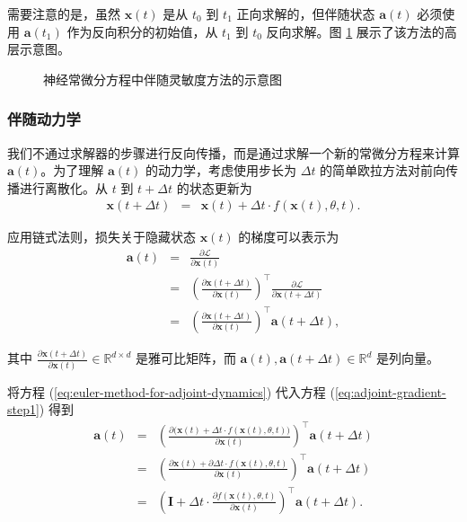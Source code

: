需要注意的是，虽然 $\mathbf{x}(t)$ 是从 $t_0$ 到 $t_1$ 正向求解的，但伴随状态 $\mathbf{a}(t)$ 必须使用 $\mathbf{a}(t_1)$ 作为反向积分的初始值，从 $t_1$ 到 $t_0$ 反向求解。图 \ref{fig:adjoint-sensitivity-method} 展示了该方法的高层示意图。

\begin{figure}[!t]
\centering
{}
\caption{神经常微分方程中伴随灵敏度方法的示意图
}
\label{fig:adjoint-sensitivity-method}
\end{figure}
\subsubsection{伴随动力学}

我们不通过求解器的步骤进行反向传播，而是通过求解一个新的常微分方程来计算 $\mathbf{a}(t)$。为了理解 $\mathbf{a}(t)$ 的动力学，考虑使用步长为 $\Delta t$ 的简单欧拉方法对前向传播进行离散化。从 $t$ 到 $t+\Delta t$ 的状态更新为
\begin{eqnarray}
\mathbf{x}(t+\Delta t) & = & \mathbf{x}(t) + \Delta t \cdot f(\mathbf{x}(t), \theta, t). \label{eq:euler-method-for-adjoint-dynamics}
\end{eqnarray}

应用链式法则，损失关于隐藏状态 $\mathbf{x}(t)$ 的梯度可以表示为
\begin{eqnarray}
\mathbf{a}(t) & = & \frac{\partial \mathcal{L}}{\partial \mathbf{x}(t)} \nonumber \\
& = & \left( \frac{\partial \mathbf{x}(t+\Delta t)}{\partial \mathbf{x}(t)} \right)^\top \frac{\partial \mathcal{L}}{\partial \mathbf{x}(t+\Delta t)} \nonumber \\
& = & \left( \frac{\partial \mathbf{x}(t+\Delta t)}{\partial \mathbf{x}(t)} \right)^\top \mathbf{a}(t+\Delta t), \label{eq:adjoint-gradient-step1}
\end{eqnarray}

\noindent 其中 $\frac{\partial \mathbf{x}(t+\Delta t)}{\partial \mathbf{x}(t)} \in \mathbb{R}^{d \times d}$ 是雅可比矩阵，而 $\mathbf{a}(t), \mathbf{a}(t+\Delta t) \in \mathbb{R}^{d}$ 是列向量。

将方程 (\ref{eq:euler-method-for-adjoint-dynamics}) 代入方程 (\ref{eq:adjoint-gradient-step1}) 得到
\begin{eqnarray}
\mathbf{a}(t) & = & \left( \frac{\partial \big( \mathbf{x}(t) + \Delta t \cdot f(\mathbf{x}(t), \theta, t) \big)}{\partial \mathbf{x}(t)} \right)^\top \mathbf{a}(t+\Delta t) \nonumber \\
& = & \left( \frac{\partial \mathbf{x}(t) + \partial \Delta t \cdot f(\mathbf{x}(t), \theta, t) }{\partial \mathbf{x}(t)} \right)^\top \mathbf{a}(t+\Delta t) \nonumber \\
& = &  \left( \mathbf{I} + \Delta t \cdot \frac{\partial f(\mathbf{x}(t), \theta, t)}{\partial \mathbf{x}(t)} \right)^\top \mathbf{a}(t+\Delta t).
\end{eqnarray}

